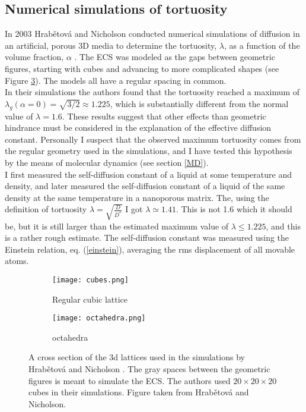 \documentclass[a4paper,english, 12pt, twoside]{article}
\begin{document}
\subsection{Numerical simulations of tortuosity}
In 2003 Hrab\v{e}tov\'{a} and Nicholson conducted numerical simulations of diffusion in an artificial, porous 3D media to determine the tortuosity, $\lambda$, as a function of the volume fraction, $\alpha$ \cite{hrabetova2004contribution}. 
The ECS was modeled as the gaps between geometric figures, starting with cubes and advancing to more complicated shapes (see Figure \ref{geometries}). 
The models all have a regular spacing in common. \\
In their simulations the authors found that the tortuosity reached a maximum of $\lambda_g(\alpha=0) = \sqrt{3/2}\approx 1.225$, which is substantially different from the normal value of $\lambda = 1.6$. 
These results suggest that other effects than geometric hindrance must be considered in the explanation of the effective diffusion constant. 
Personally I suspect that the observed maximum tortuosity comes from the regular geometry used in the simulations, and I have tested this hypothesis by the means of molecular dynamics (see section \ref{MD}). \\
I first measured the self-diffusion constant of a liquid at some temperature and density, and later measured the self-diffusion constant of a liquid of the same density at the same temperature in a nanoporous matrix. 
The, using the definition of tortuosity $\lambda = \sqrt{\frac{D}{D^*}}$ I got $\lambda \simeq 1.41$. 
This is not 1.6 which it should be, but it is still larger than the estimated maximum value of $\lambda \leq 1.225$, and this is a rather rough estimate. 
The self-diffusion constant was measured using the Einstein relation, eq. (\ref{einstein}), averaging the rms displacement of all movable atoms.

\begin{figure}[H]
\centering
  \begin{subfigure}[b]{0.48\textwidth}
    \texttt{[image: cubes.png]}
    \caption{Regular cubic lattice}
    \label{geometries:cubes}
  \end{subfigure}
  \begin{subfigure}[b]{0.48\textwidth}
    \texttt{[image: octahedra.png]}
    \caption{octahedra}
    \label{geometries:octahedra}
  \end{subfigure}
  \caption{A cross section of the 3d lattices used in the simulations by Hrab\v{e}tov\'{a} and Nicholson \cite{hrabetova2004contribution}. 
  The gray spaces between the geometric figures is meant to simulate the ECS. 
  The authors used $20\times20\times20$ cubes in their simulations. 
  Figure taken from Hrab\v{e}tov\'{a} and Nicholson.}
  \label{geometries}
\end{figure}
\end{document}
